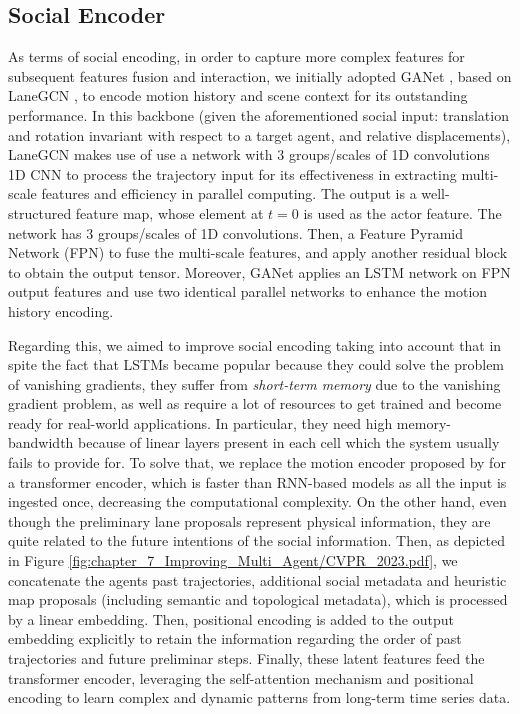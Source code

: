 \subsection{Social Encoder}
\label{subsubsec:7_improving_efficiency_social_encoder}

As terms of social encoding, in order to capture more complex features for subsequent features fusion and interaction, we initially adopted GANet \cite{wang2022ganet}, based on LaneGCN \cite{liang2020learning}, to encode motion history and scene context for its outstanding performance. In this backbone (given the aforementioned social input: translation and rotation invariant with respect to a target agent, and relative displacements), LaneGCN makes use of use a network with $3$ groups/scales of 1D convolutions 1D CNN to process the trajectory input for its effectiveness in extracting multi-scale features and efficiency in parallel computing. The output is a well-structured feature map, whose element at $t=0$ is used as the actor feature. The network has $3$ groups/scales of 1D convolutions. Then, a Feature Pyramid Network (FPN) \cite{lin2017feature} to fuse the multi-scale features, and apply another residual block to obtain the output tensor. Moreover, GANet applies an \ac{LSTM} network on FPN output features and use two identical parallel networks to enhance the motion history encoding.

Regarding this, we aimed to improve social encoding taking into account that in spite the fact that \acp{LSTM} became popular because they could solve the problem of vanishing gradients, they suffer from \textit{short-term memory} due to the vanishing gradient problem, as well as require a lot of resources to get trained and become ready for real-world applications. In particular, they need high memory-bandwidth because of linear layers present in each cell which the system usually fails to provide for. To solve that, we replace the motion encoder proposed by \cite{wang2022ganet} for a transformer encoder, which is faster than \ac{RNN}-based models as all the input is ingested once, decreasing the computational complexity. On the other hand, even though the preliminary lane proposals represent physical information, they are quite related to the future intentions of the social information. Then, as depicted in Figure \ref{fig:chapter_7_Improving_Multi_Agent/CVPR_2023.pdf}, we concatenate the agents past trajectories, additional social metadata and heuristic map proposals (including semantic and topological metadata), which is processed by a linear embedding. Then, positional encoding is added to the output embedding explicitly to retain the information regarding the order of past trajectories and future preliminar steps. Finally, these latent features feed the transformer encoder, leveraging the self-attention mechanism and positional encoding to learn complex and dynamic patterns from long-term time series data. 

